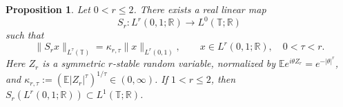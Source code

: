\documentclass[10pt,a4paper]{amsart}
\newtheorem{proposition}[theorem]{Proposition}
\newcommand{\T}{\mathbb{T}}
\newcommand{\R}{\mathbb{R}}
\begin{document}
\begin{proposition}
\label{prop:stable-embed}
Let \(0<r\le2\). There exists a real linear map
\[
        S_r:L^r(0,1;\R)\longrightarrow L^0(\T;\R)
\]
such that
\begin{equation}
\label{eq:stable-moments}
        \|S_rx\|_{L^\tau(\T)}
        =
        \kappa_{r,\tau}\|x\|_{L^r(0,1)},
        \qquad
        x\in L^r(0,1;\R),\quad 0<\tau<r.
\end{equation}
Here \(Z_r\) is a symmetric \(r\)-stable random variable, normalized by
\(\mathbb E e^{i\theta Z_r}=e^{-|\theta|^r}\), and
\(\kappa_{r,\tau}:=(\mathbb E|Z_r|^\tau)^{1/\tau}\in(0,\infty)\).
If \(1<r\le2\), then
\(S_r(L^r(0,1;\R))\subset L^1(\T;\R)\).
\end{proposition}
\end{document}
